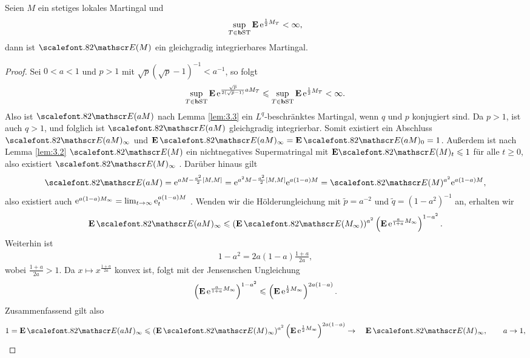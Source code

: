 \begin{theorem}
\label{prop:3.10}
Seien $M$ ein stetiges lokales Martingal und
\begin{align*}
\sup\limits_{T\in \mathbf{b}\mathrm{ST}} \mathbf{E}\, \mathrm{e}^{\frac{1}{2}M_T} < \infty,
\end{align*}
dann ist $\Ep(M)$ ein gleichgradig integrierbares Martingal.\fish
\end{theorem}
\begin{proof}
Sei $0 < a < 1$ und $p > 1$ mit $\sqrt{p}(\sqrt{p}-1)^{-1} < a^{-1}$, so folgt
\begin{align*}
\sup_{T\in\mathbf{b}\mathrm{ST}} \mathbf{E}\, \mathrm{e}^{\frac{\sqrt{p}}{2(\sqrt{p}-1)}aM_T}
\leqslant
\sup_{T\in\mathbf{b}\mathrm{ST}} \mathbf{E}\, \mathrm{e}^{\frac{1}{2}M_T} < \infty.  
\end{align*}
Also ist $\Ep(aM)$ nach Lemma \ref{lem:3.3} ein $L^q$-beschränktes Martingal,
wenn $q$ und $p$ konjugiert sind. Da $p>1$, ist auch $q>1$, und folglich ist
$\Ep(aM)$ gleichgradig integrierbar. Somit existiert ein Abschluss
$\Ep(aM)_\infty$ und $\E\, \Ep(aM)_\infty = \E\, \Ep(aM)_0 = 1$. 
Außerdem ist nach Lemma \ref{lem:3.2} $\Ep(M)$ ein nichtnegatives
Supermatringal mit $\E \Ep(M)_t \le 1$ für alle $t \ge 0$, also existiert
$\Ep(M)_\infty$ \fs.
Darüber hinaus
gilt
\begin{align*}
\Ep(aM) = \e^{aM-\frac{a^2}{2}[M,M]} = \e^{a^2M-\frac{a^2}{2}[M,M]}\e^{a(1-a)M}
= \Ep(M)^{a^2}\e^{a(1-a)M},
\end{align*}
also existiert auch $\mathrm{e}^{a(1-a)M_\infty} = \lim_{t\to\infty}
\mathrm{e}^{a(1-a)M}_t$ \fs.
Wenden wir die Hölderungleichung mit $\tilde p = a^{-2}$ und $\tilde q =
(1-a^{2})^{-1}$ an, erhalten wir
\begin{align*}
\E\, \Ep(aM)_\infty \le
(\E\,\Ep(M_\infty))^{a^2}
\left(\E\,\e^{\frac{a}{1+a}M_\infty}\right)^{1-a^2}. 
\end{align*}
Weiterhin ist
\begin{align*}
1-a^2 = 2a(1-a) \frac{1+a}{2a},
\end{align*}
wobei $\frac{1+a}{2a} > 1$. Da $x\mapsto x^{\frac{1+a}{2a}}$ konvex ist, folgt
mit der Jensenschen Ungleichung
\begin{align*}
\left(\mathbf{E}\,\mathrm{e}^{\frac{a}{1+a}M_\infty}\right)^{1-a^2}
\leqslant 
\left(\mathbf{E}\,\mathrm{e}^{\frac{1}{2}M_\infty}\right)^{2a(1-a)}.
\end{align*}
Zusammenfassend gilt also
\begin{align*}
1 = \E\, \Ep(aM)_\infty \le 
(\E\,\Ep(M)_\infty)^{a^2}
\left(\E\,\e^{\frac{1}{2}M_\infty}\right)^{2a(1-a)} \to\quad
\E\,\Ep(M)_\infty,\qquad a \to 1,

\end{align*}
\end{proof}
